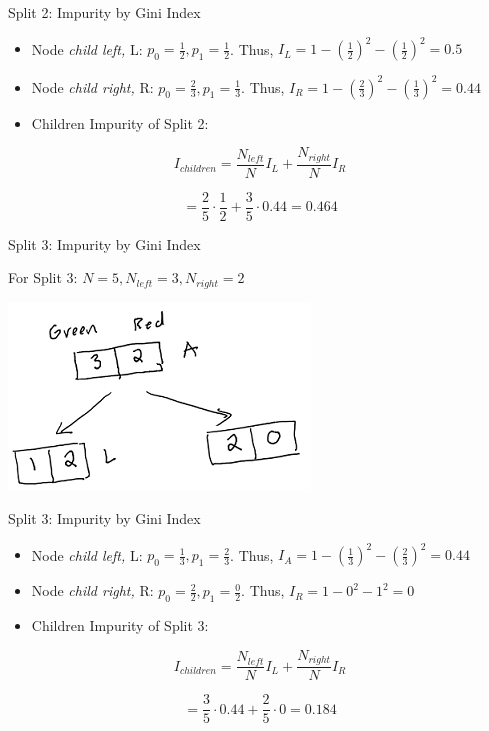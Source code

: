 \documentclass[
  ignorenonframetext,
]{beamer}
\begin{document}
\begin{frame}{Split 2: Impurity by Gini Index}
\protect\hypertarget{split-2-impurity-by-gini-index-1}{}

\begin{itemize}
\item
  Node \emph{child left,} L: \(p_0 = \frac{1}{2}, p_1 = \frac{1}{2}\).
  Thus, \(I_{L} = 1- (\frac{1}{2})^2-(\frac{1}{2})^2=0.5\)
\item
  Node \emph{child right,} R: \(p_0 = \frac{2}{3}, p_1 = \frac{1}{3}\).
  Thus, \(I_{R} = 1-(\frac{2}{3})^2 -(\frac{1}{3})^2 = 0.44\)
\item
  Children Impurity of Split 2:
\end{itemize}

\[
I_{children} =  \frac{N_{left}}{N}I_{L} + \frac{N_{right}}{N}I_{R}
\]

\[ = \frac{2}{5} \cdot \frac{1}{2} + \frac{3}{5} \cdot 0.44 = 0.464\]

\end{frame}

\begin{frame}{Split 3: Impurity by Gini Index}
\protect\hypertarget{split-3-impurity-by-gini-index}{}

For Split 3: \(N = 5, N_{left} =3, N_{right} = 2\)

\includegraphics{images2/im2.png}

\end{frame}

\begin{frame}{Split 3: Impurity by Gini Index}
\protect\hypertarget{split-3-impurity-by-gini-index-1}{}

\begin{itemize}
\item
  Node \emph{child left,} L: \(p_0 = \frac{1}{3}, p_1 = \frac{2}{3}\).
  Thus, \(I_{A} = 1-(\frac{1}{3})^2 -(\frac{2}{3})^2 = 0.44\)
\item
  Node \emph{child right,} R: \(p_0 = \frac{2}{2}, p_1 = \frac{0}{2}\).
  Thus, \(I_{R} = 1-0^2-1^2 = 0\)
\item
  Children Impurity of Split 3:
\end{itemize}

\[
I_{children} =  \frac{N_{left}}{N}I_{L} + \frac{N_{right}}{N}I_{R}
\]

\[ = \frac{3}{5} \cdot 0.44 + \frac{2}{5} \cdot 0 = 0.184\]

\end{frame}
\end{document}
